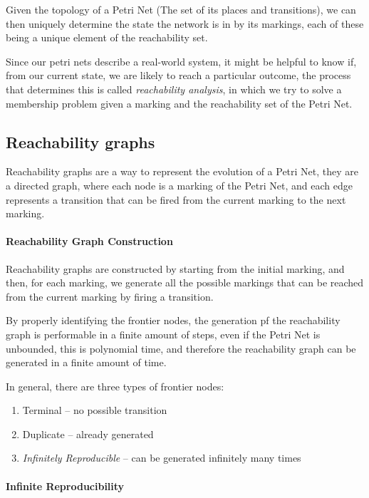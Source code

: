 \documentclass[openright, twoside, twocolumn]{report}
\begin{document}
    Given the topology of a Petri Net (The set of its places and transitions), we can then
    uniquely determine the state the network is in by its markings, each of these being a
    unique element of the reachability set.

    Since our petri nets describe a real-world system, it might be helpful to know if,
    from our current state, we are likely to reach a particular outcome, the process that
    determines this is called \emph{reachability analysis}, in which we
    try to solve a membership problem given a marking and the reachability set of the Petri Net.

    \subsection{Reachability graphs}

    Reachability graphs are a way to represent the evolution of a Petri Net, they are a directed graph, where
    each node is a marking of the Petri Net, and each edge represents a transition that can be fired from the
    current marking to the next marking.

    \paragraph{Reachability Graph Construction}

    Reachability graphs are constructed by starting from the initial marking, and then, for each marking, we
    generate all the possible markings that can be reached from the current marking by firing a transition.

    By properly identifying the frontier nodes, the generation pf the reachability graph
    is performable in a finite amount of steps, even if the Petri Net is unbounded, this is
    polynomial time, and therefore the reachability graph can be generated in a finite amount of time.

    In general, there are three types of frontier nodes:

    \begin{enumerate}
      \item Terminal -- no possible transition
      \item Duplicate -- already generated
      \item \emph{Infinitely Reproducible} -- can be generated infinitely many times
    \end{enumerate}

    \paragraph{Infinite Reproducibility}
\end{document}
